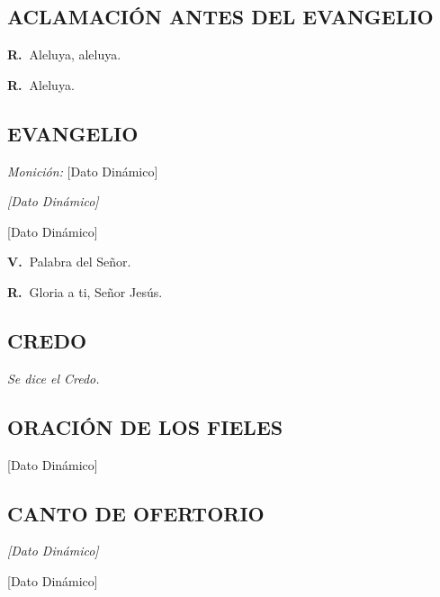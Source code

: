 \documentclass[11pt, letterpaper, twoside]{article}
\newcommand{\rubrica}[1]{\textcolor{rubricred}{\small\textit{#1}}}
\newcommand{\vers}{\textcolor{rubricred}{\textbf{V.\ }}}
\newcommand{\resp}{\textcolor{rubricred}{\textbf{R.\ }}}
\DeclareRobustCommand{\VAR}[1]{[Dato Dinámico]}
\DeclareRobustCommand{\BLOCK}[1]{}
\begin{document}
\begin{multicols}{2}
\BLOCK{ if misa.aclamacion_evangelio }
\subsection*{ACLAMACIÓN ANTES DEL EVANGELIO}
\resp Aleluya, aleluya. \par
\VAR{misa.aclamacion_evangelio | escape_tex} \par
\resp Aleluya. \par\vspace{0.3cm}
\BLOCK{ endif }

\BLOCK{ if misa.evangelio }
\subsection*{EVANGELIO}
\BLOCK{ if misa.monicion_evangelio }
\noindent\rubrica{Monición:} \VAR{misa.monicion_evangelio | escape_tex} \par\vspace{0.2cm}
\BLOCK{ endif }
\noindent\rubrica{\VAR{misa.evangelio.cita | escape_tex}} \par\vspace{0.2cm}
\VAR{misa.evangelio.texto | escape_tex | lettrine} \par\vspace{0.2cm}
\vers Palabra del Señor. \par
\resp Gloria a ti, Señor Jesús.
\BLOCK{ endif }


\BLOCK{ if misa.credo }
\subsection*{CREDO}
\noindent\rubrica{Se dice el Credo.} \par\vspace{0.3cm}
\BLOCK{ endif }

\BLOCK{ if misa.oracion_fieles }
\subsection*{ORACIÓN DE LOS FIELES}
\VAR{misa.oracion_fieles | escape_tex} \par\vspace{0.3cm}
\BLOCK{ endif }

\BLOCK{ if misa.canto_ofertorio }
\subsection*{CANTO DE OFERTORIO}
\noindent\rubrica{\VAR{misa.canto_ofertorio.titulo | escape_tex}} \par\vspace{0.1cm}
\VAR{misa.canto_ofertorio.letra | format_canto}
\par\vspace{0.3cm}
\BLOCK{ endif }


\end{multicols}
\end{document}

